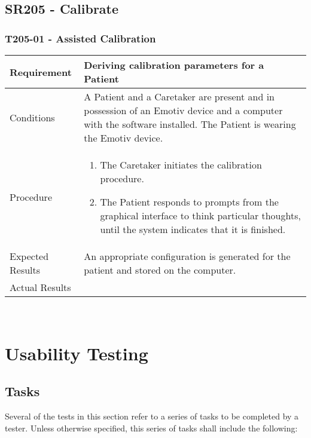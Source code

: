 \documentclass{article}
\begin{document}
\subsection{SR205 - Calibrate}
\subsubsection{T205-01 - Assisted Calibration}
\begin{tabular}{| l | p{12cm} |}
    \hline
	Requirement & Deriving calibration parameters for a Patient \\ \hline
	Conditions & A Patient and a Caretaker are present and in possession of an
	Emotiv device and a computer with the software installed. The Patient is
	wearing the Emotiv device. \\ \hline
    Procedure &
\begin{enumerate}
    \item The Caretaker initiates the calibration procedure.
    \item The Patient responds to prompts from the graphical interface to
        think particular thoughts, until the system indicates that it is
        finished.
\end{enumerate} \\ \hline
	Expected Results & An appropriate configuration is generated for the
patient and stored on the computer. \\ \hline
Actual Results & \vspace{1cm} \\ \hline
\end{tabular}

\hfill \\

\newpage

\section{Usability Testing}
\subsection{Tasks}

Several of the tests in this section refer to a series of tasks to be
completed by a tester. Unless otherwise specified, this series of tasks shall
include the following:
\end{document}
